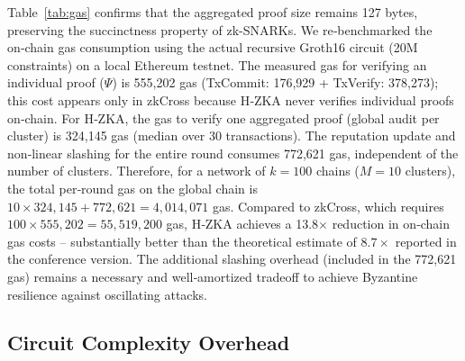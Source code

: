 \documentclass[journal]{IEEEtran}
\begin{document}
Table~\ref{tab:gas} confirms that the aggregated proof size remains 127 bytes, preserving the succinctness property of zk-SNARKs. 
We re‑benchmarked the on‑chain gas consumption using the actual recursive Groth16 circuit (20M constraints) on a local Ethereum testnet. 
The measured gas for verifying an individual proof ($\Psi$) is 555,202 gas (TxCommit: 176,929 + TxVerify: 378,273); this cost appears only in zkCross because H‑ZKA never verifies individual proofs on‑chain. 
For H‑ZKA, the gas to verify one aggregated proof (global audit per cluster) is 324,145 gas (median over 30 transactions). 
The reputation update and non‑linear slashing for the entire round consumes 772,621 gas, independent of the number of clusters. 
Therefore, for a network of $k = 100$ chains ($M = 10$ clusters), the total per‑round gas on the global chain is $10 \times 324,145 + 772,621 = 4,014,071$ gas. 
Compared to zkCross, which requires $100 \times 555,202 = 55,519,200$ gas, H‑ZKA achieves a 13.8$\times$ reduction in on‑chain gas costs – substantially better than the theoretical estimate of $8.7\times$ reported in the conference version. 
The additional slashing overhead (included in the 772,621 gas) remains a necessary and well‑amortized tradeoff to achieve Byzantine resilience against oscillating attacks.

\subsection{Circuit Complexity Overhead}
\label{sec:circuitanalysis}
\end{document}
